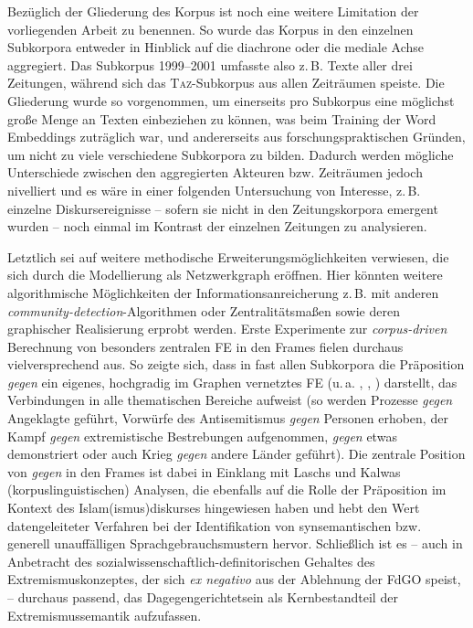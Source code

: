 Bezüglich der Gliederung des Korpus ist noch eine weitere Limitation der vorliegenden Arbeit zu benennen. So wurde das Korpus in den einzelnen Subkorpora entweder in Hinblick auf die diachrone oder die mediale Achse aggregiert. Das Subkorpus 1999--2001 umfasste also z.\,B. Texte aller drei Zeitungen, während sich das \textsc{Taz}-Subkorpus aus allen Zeiträumen speiste. Die Gliederung wurde so vorgenommen, um einerseits pro Subkorpus eine möglichst große Menge an Texten einbeziehen zu können, was beim Training der Word Embeddings zuträglich war, und andererseits aus forschungspraktischen Gründen, um nicht zu viele verschiedene Subkorpora zu bilden. Dadurch werden mögliche Unterschiede zwischen den aggregierten Akteuren bzw. Zeiträumen jedoch nivelliert und es wäre in einer folgenden Untersuchung von Interesse, z.\,B. einzelne Diskursereignisse -- sofern sie nicht in den Zeitungskorpora emergent wurden -- noch einmal im Kontrast der einzelnen Zeitungen zu analysieren.

Letztlich sei auf weitere methodische Erweiterungsmöglichkeiten verwiesen, die sich durch die Modellierung als Netzwerkgraph eröffnen. Hier könnten weitere algorithmische Möglichkeiten der Informationsanreicherung z.\,B. mit anderen \emph{community-detection}-Algorithmen oder Zentralitätsmaßen sowie deren graphischer Realisierung erprobt werden. Erste Experimente zur \emph{corpus-driven} Berechnung von besonders zentralen FE in den Frames fielen durchaus vielversprechend aus. So zeigte sich, dass in fast allen Subkorpora die Präposition \emph{gegen} ein eigenes, hochgradig im Graphen vernetztes FE (u.\,a. , , ) darstellt, das Verbindungen in alle thematischen Bereiche aufweist (so werden Prozesse \emph{gegen} Angeklagte geführt, Vorwürfe des Antisemitismus \emph{gegen} Personen erhoben, der Kampf \emph{gegen} extremistische Bestrebungen aufgenommen, \emph{gegen} etwas demonstriert oder auch Krieg \emph{gegen} andere Länder geführt). Die zentrale Position von \emph{gegen} in den Frames ist dabei in Einklang mit Laschs \autocite*{laschZurVereinbarkeitDiskurslinguistisch2014} und Kalwas \autocite*{kalwaKonzeptIslamDiskurslinguistische2013} (korpuslinguistischen) Analysen, die ebenfalls auf die Rolle der Präposition im Kontext des Islam(ismus)diskurses hingewiesen haben und hebt den Wert datengeleiteter Verfahren bei der Identifikation von synsemantischen bzw. generell unauffälligen Sprachgebrauchsmustern hervor. Schließlich ist es -- auch in Anbetracht des sozialwissenschaftlich-definitorischen Gehaltes des Extremismuskonzeptes, der sich \emph{ex negativo} aus der Ablehnung der FdGO speist, -- durchaus passend, das Dagegengerichtetsein als Kernbestandteil der Extremismussemantik aufzufassen.

